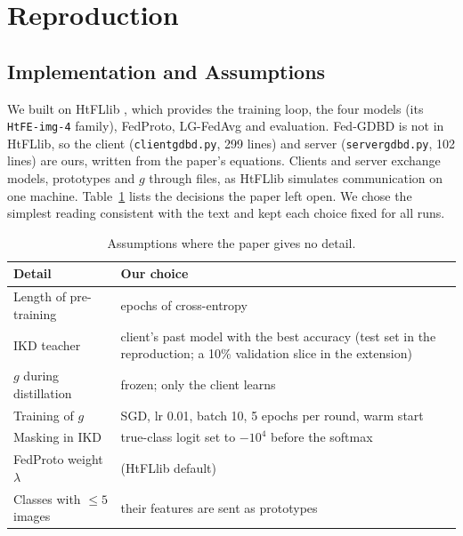 \documentclass[conference]{IEEEtran}
\begin{document}
\section{Reproduction}
\label{sec:repro}

\subsection{Implementation and Assumptions}
We built on HtFLlib \cite{zhang2025htfllib}, which provides the training loop, the four models (its \texttt{HtFE-img-4} family), FedProto, LG-FedAvg and evaluation. Fed-GDBD is not in HtFLlib, so the client (\texttt{clientgdbd.py}, 299 lines) and server (\texttt{servergdbd.py}, 102 lines) are ours, written from the paper's equations. Clients and server exchange models, prototypes and $g$ through files, as HtFLlib simulates communication on one machine. Table~\ref{tab:assumptions} lists the decisions the paper left open. We chose the simplest reading consistent with the text and kept each choice fixed for all runs.

\begin{table}[t]
\centering
\caption{Assumptions where the paper gives no detail.}
\label{tab:assumptions}
\footnotesize
\begin{tabularx}{\columnwidth}{>{\raggedright\arraybackslash}p{2.6cm}>{\raggedright\arraybackslash}X}
\toprule
Detail & Our choice \\
\midrule
Length of pre-training & 5 epochs of cross-entropy \\
IKD teacher & client's past model with the best accuracy (test set in the reproduction; a 10\% validation slice in the extension) \\
$g$ during distillation & frozen; only the client learns \\
Training of $g$ & SGD, lr 0.01, batch 10, 5 epochs per round, warm start \\
Masking in IKD & true-class logit set to $-10^4$ before the softmax \\
FedProto weight $\lambda$ & 10 (HtFLlib default) \\
Classes with $\le 5$ images & their features are sent as prototypes \\
\bottomrule
\end{tabularx}
\end{table}
\end{document}
